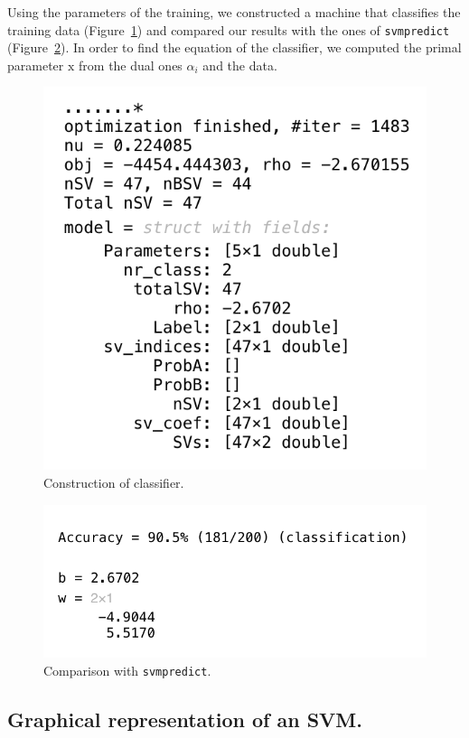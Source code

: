 \documentclass[journal]{IEEEtran}
\begin{document}
Using the parameters of the training, we constructed a machine that classifies the training data (Figure~\ref{fig:Param}) and compared our results with the ones of \texttt{svmpredict} (Figure~\ref{fig:svmPredict}). In order to find the equation of the classifier, we computed the primal parameter \( \bm{\mathrm{x}} \) from the dual ones \( \alpha_i \) and the data.

\begin{figure}[ht]
    \centering
    \includegraphics[width=0.8\linewidth]{modelParam.png}
    \caption{Construction of classifier.}
    \label{fig:Param}
\end{figure}

\begin{figure}[ht]
    \centering
    \includegraphics[width=0.8\linewidth]{svmpredict.png}
    \caption{Comparison with \texttt{svmpredict}.}
    \label{fig:svmPredict}
\end{figure}

\subsection{Graphical representation of an SVM.}
\end{document}
